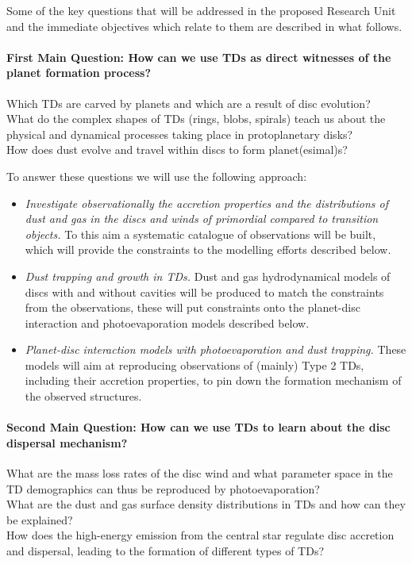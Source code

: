 \documentclass[12pt]{article}
\begin{document}
Some of the key questions that will be addressed in the proposed
Research Unit and the immediate objectives which relate to them are
described in what follows. 

\paragraph{First Main Question: How can we use TDs as direct witnesses of the planet
  formation process?}
Which TDs are carved by planets and which are a result of disc evolution? \\ What do the complex shapes of TDs (rings, blobs, spirals) teach us about the physical and
dynamical processes taking place in protoplanetary disks?\\ How does
dust evolve and travel within discs to form planet(esimal)s?

To answer these questions we will use the following approach: 

\begin{itemize}
\item{\it Investigate observationally the accretion properties
  and the distributions of dust and gas in the discs and winds of
  primordial compared to transition objects.} To this aim a systematic catalogue of observations will be built, which will provide the constraints to the modelling efforts described below. 
\item{\it Dust trapping and growth in TDs.} Dust and
gas hydrodynamical models of discs with and without cavities will be produced to match the
constraints from the observations, these will put constraints onto the
planet-disc interaction and photoevaporation models described below. 
\item{\it Planet-disc interaction models with photoevaporation
  and dust trapping.} These models will aim at reproducing
observations of (mainly) Type 2 TDs, including their accretion properties, to pin down the formation mechanism of the observed structures. 
\end{itemize}



\paragraph {Second Main Question: How can we use TDs to learn about the disc dispersal
    mechanism?}
 What are the mass loss rates of the disc wind and
  what parameter space in the TD demographics can thus be reproduced
  by photoevaporation?\\ What are the dust and gas surface density
  distributions in TDs and how can they be
  explained?\\How does the high-energy emission from the central
  star regulate disc accretion and dispersal, leading to the formation
  of different types of TDs?
\end{document}
